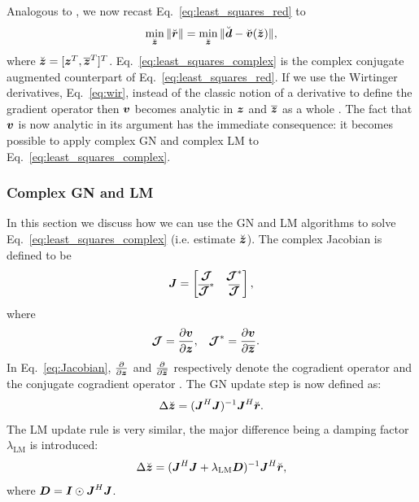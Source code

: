 \documentclass[useAMS,usenatbib]{mn2e}
\newcommand{\bz}{\bmath{z}}
\newcommand{\br}{\bmath{r}}
\newcommand{\bd}{\bmath{d}}
\newcommand{\bv}{\bmath{v}}
\newcommand{\bJ}{\bmath{J}}
\newcommand{\bD}{\bmath{D}}
\newcommand{\bI}{\bmath{I}}
\newcommand{\bmJ}{\bmath{\mathcal{J}}}
\newcommand{\conj}[1]{\overline{#1}}
\begin{document}
Analogous to \cite{Smirnov2015}, we now recast Eq.~\eqref{eq:least_squares_red} to 
\begin{equation}
\label{eq:least_squares_complex}
\min_{\breve{\bz}} \|\breve{\br}\| = \min_{\breve{\bz}} \|\breve{\bd} - \breve{\bv}(\breve{\bz})\|, 
\end{equation}
where $\breve{\bz} = [\bz^T,\conj{\bz}^T]^T$. Eq.~\eqref{eq:least_squares_complex} is the complex conjugate augmented counterpart of Eq.~\eqref{eq:least_squares_red}.
If we use the Wirtinger derivatives, Eq.~\eqref{eq:wir}, instead of the classic notion of a derivative to define the gradient operator then 
$\bv$ becomes analytic in $\bz$ and $\conj{\bz}$ as a whole \citep{Smirnov2015}. The fact that $\bv$ is now analytic in its argument has the immediate consequence: it becomes possible to apply complex GN
and complex LM to Eq.~\eqref{eq:least_squares_complex}. 

\subsubsection{Complex GN and LM}
In this section we discuss how we can use the GN and LM algorithms to solve Eq.~\eqref{eq:least_squares_complex} (i.e. estimate $\breve{\bz}$). The complex Jacobian is defined to be
\begin{equation}
\label{eq:Jacobian}
\bJ = \begin{bmatrix}
       \bmJ & \bmJ^*\\
       \conj{\bmJ}^* & \conj{\bmJ} 
      \end{bmatrix},
\end{equation}
where 
\begin{align}
\bmJ &= \frac{\partial \bv}{\partial \bz}, & \bmJ^* &= \frac{\partial \bv}{\partial \conj{\bz}}. 
\end{align}
In Eq.~\eqref{eq:Jacobian}, $\frac{\partial}{\partial \bz}$ and $\frac{\partial}{\partial \conj{\bz}}$ respectively denote the cogradient operator and the conjugate cogradient operator \citep{Sorber2012}.
The GN update step is now defined as:
\begin{equation}
\label{eq:GN_update}
 \Delta \breve{\bz} = (\bJ^H\bJ)^{-1}\bJ^H\breve{\br}.
\end{equation}
The LM update rule is very similar, the major difference being a damping factor $\lambda_{\textrm{LM}}$ is introduced:
\begin{equation}
\label{eq:LM_update}
\Delta \breve{\bz} = (\bJ^H\bJ + \lambda_{\textrm{LM}}\bD)^{-1}\bJ^H\breve{\br},
\end{equation}
where $\bD=\bI\odot\bJ^H\bJ$. 
\end{document}
